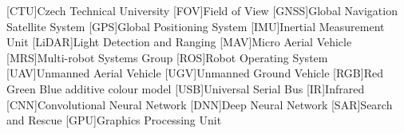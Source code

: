 
\begin{acronym}
  [CTU]{Czech Technical University}
  [FOV]{Field of View}
  [GNSS]{Global Navigation Satellite System}
  [GPS]{Global Positioning System}
  [IMU]{Inertial Measurement Unit}
  [LiDAR]{Light Detection and Ranging}
  [MAV]{Micro Aerial Vehicle}
  [MRS]{Multi-robot Systems Group}
  [ROS]{Robot Operating System}
  [UAV]{Unmanned Aerial Vehicle}
  [UGV]{Unmanned Ground Vehicle}
  [RGB]{Red Green Blue additive colour model}
  [USB]{Universal Serial Bus}
  [IR]{Infrared}
  [CNN]{Convolutional Neural Network}
  [DNN]{Deep Neural Network}
  [SAR]{Search and Rescue}
  [GPU]{Graphics Processing Unit}
\end{acronym}
